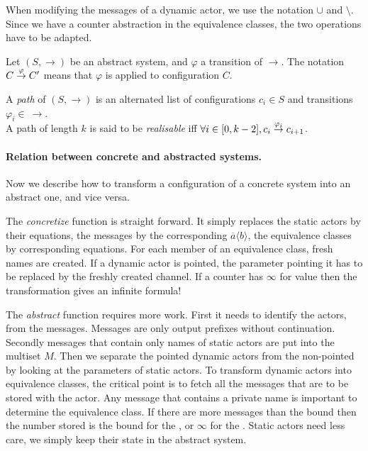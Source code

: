 \documentclass[a4paper]{report}
\numberwithin{algorithm}{chapter}
\begin{document}
\begin{rem}
When modifying the messages of a dynamic actor, we use the notation $\cup$ and $\setminus$.
Since we have a counter abstraction in the equivalence classes, the two operations have to be adapted.
\end{rem}

\begin{rem}
Let $(S,\rightarrow)$ be an abstract system, and $\varphi$ a transition of $\rightarrow$.
The notation $C \buildrel\varphi\over\rightarrow C^\prime$ means that $\varphi$ is applied to configuration $C$.
\end{rem} 

\begin{define}[path] 
A \emph{path} of $(S,\rightarrow)$ is an alternated list of configurations $c_i \in S$ and transitions $\varphi_i \in \ \rightarrow$.\\
A path of length $k$ is said to be \emph{realisable} iff $\forall i \in [0,k-2], c_i \buildrel\varphi_i\over\rightarrow c_{i+1}$.
\end{define}

\paragraph{Relation between concrete and abstracted systems.}
Now we describe how to transform a configuration of a concrete system into an abstract one, and vice versa.

The \emph{concretize} function is straight forward.
It simply replaces the static actors by their equations,
the messages by the corresponding $\overline a \langle b \rangle$,
the equivalence classes by corresponding equations.
For each member of an equivalence class, fresh names are created.
If a dynamic actor is pointed, the parameter pointing it has to be replaced by the freshly created channel.
If a counter has $\infty$ for value then the transformation gives an infinite formula!

The \emph{abstract} function requires more work.
First it needs to identify the actors, from the messages.
Messages are only output prefixes without continuation.
Secondly messages that contain only names of static actors are put into the multiset $M$.
Then we separate the pointed dynamic actors from the non-pointed by looking at the parameters of static actors.
To transform dynamic actors into equivalence classes, the critical point is to fetch all the messages that are to be stored with the actor.
Any message that contains a private name is important to determine the equivalence class.
If there are more messages than the bound then the number stored is the bound for the \dabs{}, or $\infty$ for the \iabs{}.
Static actors need less care, we simply keep their state in the abstract system.
\end{document}
